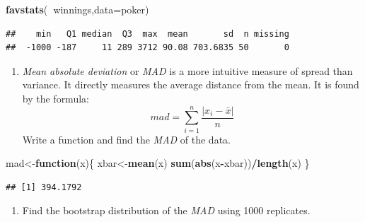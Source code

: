 \documentclass[
]{book}
\newenvironment{Shaded}{\begin{snugshade}}{\end{snugshade}}
\newcommand{\ControlFlowTok}[1]{\textcolor[rgb]{0.13,0.29,0.53}{\textbf{#1}}}
\newcommand{\DataTypeTok}[1]{\textcolor[rgb]{0.13,0.29,0.53}{#1}}
\newcommand{\KeywordTok}[1]{\textcolor[rgb]{0.13,0.29,0.53}{\textbf{#1}}}
\newcommand{\NormalTok}[1]{#1}
\newcommand{\OperatorTok}[1]{\textcolor[rgb]{0.81,0.36,0.00}{\textbf{#1}}}
\providecommand{\tightlist}{%
  \setlength{\itemsep}{0pt}\setlength{\parskip}{0pt}}
\begin{document}
\begin{Shaded}
\begin{Highlighting}[]
\KeywordTok{favstats}\NormalTok{(}\OperatorTok{~}\NormalTok{winnings,}\DataTypeTok{data=}\NormalTok{poker)}
\end{Highlighting}
\end{Shaded}

\begin{verbatim}
##    min   Q1 median  Q3  max  mean       sd  n missing
##  -1000 -187     11 289 3712 90.08 703.6835 50       0
\end{verbatim}

\begin{enumerate}
\def\labelenumi{\alph{enumi}.}
\setcounter{enumi}{2}
\tightlist
\item
  \emph{Mean absolute deviation} or \emph{MAD} is a more intuitive measure of spread than variance. It directly measures the average distance from the mean. It is found by the formula:
  \[mad = \sum_{i=1}^{n}\frac{\left| x_{i} - \bar{x} \right|}{n}\]
  Write a function and find the \emph{MAD} of the data.
\end{enumerate}

\begin{Shaded}
\begin{Highlighting}[]
\NormalTok{mad<-}\ControlFlowTok{function}\NormalTok{(x)\{}
\NormalTok{  xbar<-}\KeywordTok{mean}\NormalTok{(x)}
  \KeywordTok{sum}\NormalTok{(}\KeywordTok{abs}\NormalTok{(x}\OperatorTok{-}\NormalTok{xbar))}\OperatorTok{/}\KeywordTok{length}\NormalTok{(x)}
\NormalTok{\}}
\end{Highlighting}
\end{Shaded}

\begin{Shaded}
\end{Shaded}

\begin{verbatim}
## [1] 394.1792
\end{verbatim}

\begin{enumerate}
\def\labelenumi{\alph{enumi}.}
\setcounter{enumi}{3}
\tightlist
\item
  Find the bootstrap distribution of the \emph{MAD} using 1000 replicates.
\end{enumerate}
\end{document}

